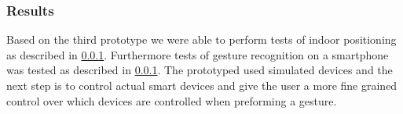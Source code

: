 \subsubsection{Results}

Based on the third prototype we were able to perform tests of indoor positioning as described in \ref{}. Furthermore tests of gesture recognition on a smartphone was tested as described in \ref{}.
The prototyped used simulated devices and the next step is to control actual smart devices and give the user a more fine grained control over which devices are controlled when preforming a gesture.

\begin{figure}[!htb]%
    \centering
\end{figure}
